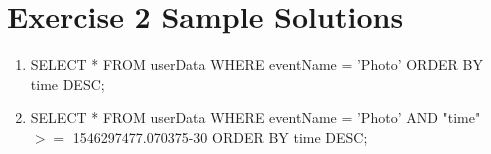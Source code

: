 \documentclass[USenglish,final,authoryear,12pt]{article}
\begin{document}
\section{Exercise 2 Sample Solutions}
\begin{enumerate}
	\item SELECT *\newline
	FROM userData\newline
	WHERE eventName = 'Photo'\newline
	ORDER BY time DESC;
	\item SELECT *\newline
	FROM userData\newline
	WHERE eventName = 'Photo' AND\newline
	"time"$>=$ 1546297477.070375-30\newline
	ORDER BY time DESC;
\end{enumerate}
\end{document}
